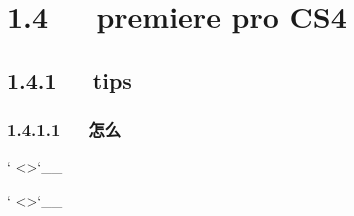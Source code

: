 \documentclass[letterpaper,12pt,english]{sphinxmanual}
\begin{document}
\begin{sphinxVerbatim}[commandchars=\\\{\}]
\PYGZbs{} \PYGZbs{}
\end{sphinxVerbatim}


\section{1.4   premiere pro CS4}
\label{\detokenize{001software/001install/adobe:premiere-pro-cs4}}

\subsection{1.4.1   tips}
\label{\detokenize{001software/001install/adobe:tips}}

\subsubsection{1.4.1.1   怎么}
\label{\detokenize{001software/001install/adobe:id5}}
{}` \textless{}\textgreater{}{}`\_\_

{}` \textless{}\textgreater{}{}`\_\_
\end{document}
